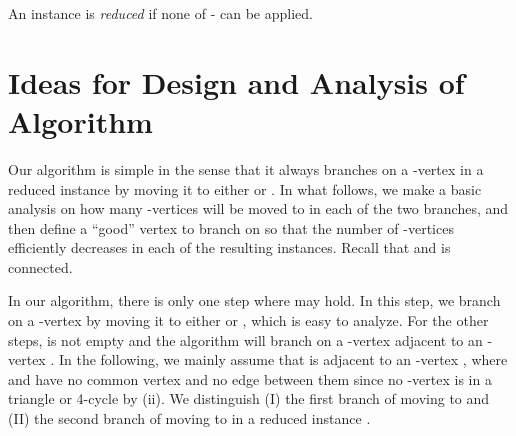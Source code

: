 \documentclass{elsart_TR2}
\begin{document}
An instance is \emph{reduced} if none of   - can be applied.





\section{Ideas for Design and Analysis of Algorithm}\label{sec_alg}
Our algorithm is simple in the sense that it always branches on a -vertex  in a reduced instance by moving it to either  or .
In what follows, we make a basic analysis on how many -vertices will be moved to  in each of the two branches,
and then define a ``good'' vertex to branch on so that the number of -vertices efficiently decreases in each of the resulting instances.
Recall that  and  is connected.




In our algorithm, there is only one step where  may hold.
In this step, we branch on  a -vertex by moving it to either  or , which is easy to analyze.
For the other steps,  is not empty and the algorithm will branch on a  -vertex  adjacent to an -vertex .
In the following, we mainly assume that  is
adjacent to an -vertex , where  and  have no common vertex and no edge between them
since no -vertex is in a triangle or 4-cycle by (ii).
We distinguish (I) the first branch of moving    to  and (II) the second branch of moving    to 
in a reduced instance .
\end{document}
